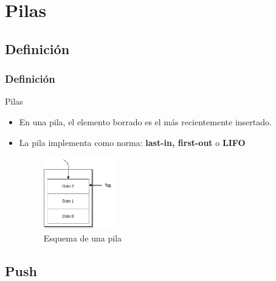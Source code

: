 \documentclass{beamer}
\begin{document}
\section{Pilas}

\subsection{Definición}

\begin{frame}
    \frametitle{Definición}
    Pilas \\
    \begin{itemize}
      \item En una pila, el elemento borrado es el más recientemente insertado.
      \item La pila implementa como norma: \textbf{last-in, first-out} o  \textbf{LIFO}

      \begin{figure}
      \caption{Esquema de una pila}
      \includegraphics[width=0.3\textwidth]{images/pila}
      
      \end{figure}
    \end{itemize}
        
    
\end{frame}


\subsection{Push}
\end{document}
